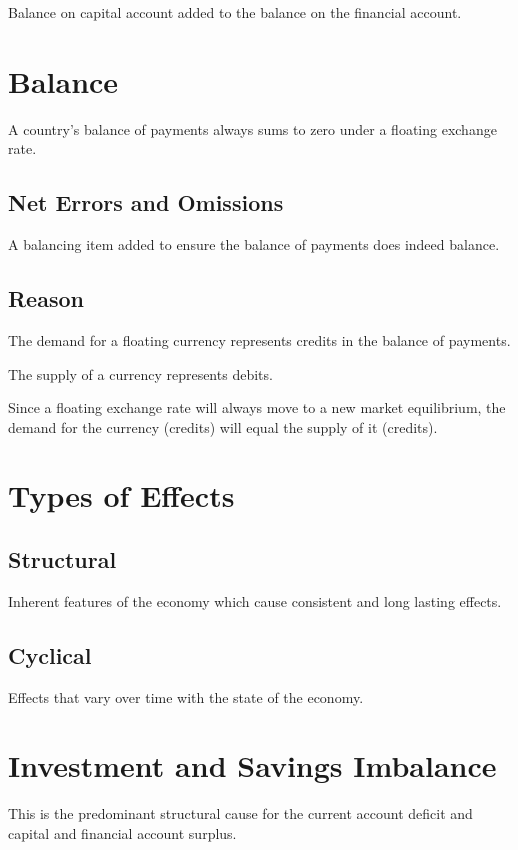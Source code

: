 \documentclass[a4paper,11pt]{report}
\begin{document}
Balance on capital account added to the balance on the financial account.


\section{Balance}

A country's balance of payments always sums to zero under a floating exchange
rate.

\subsection{Net Errors and Omissions}

A balancing item added to ensure the balance of payments does indeed balance.

\subsection{Reason}

The demand for a floating currency represents credits in the balance of
payments.

The supply of a currency represents debits.

Since a floating exchange rate will always move to a new market equilibrium,
the demand for the currency (credits) will equal the supply of it (credits).


\section{Types of Effects}

\subsection{Structural}

Inherent features of the economy which cause consistent and long lasting
effects.

\subsection{Cyclical}

Effects that vary over time with the state of the economy.


\section{Investment and Savings Imbalance}

This is the predominant structural cause for the current account deficit and
capital and financial account surplus.
\end{document}
